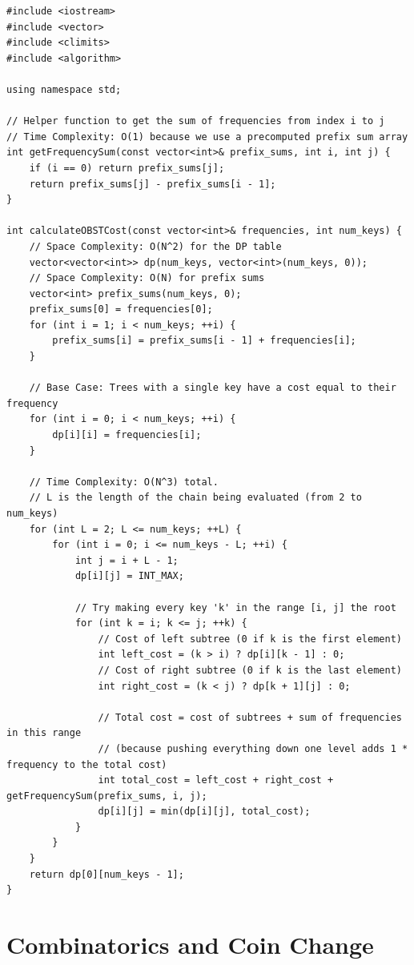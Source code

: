\begin{lstlisting}
#include <iostream>
#include <vector>
#include <climits>
#include <algorithm>

using namespace std;

// Helper function to get the sum of frequencies from index i to j
// Time Complexity: O(1) because we use a precomputed prefix sum array
int getFrequencySum(const vector<int>& prefix_sums, int i, int j) {
    if (i == 0) return prefix_sums[j];
    return prefix_sums[j] - prefix_sums[i - 1];
}

int calculateOBSTCost(const vector<int>& frequencies, int num_keys) {
    // Space Complexity: O(N^2) for the DP table
    vector<vector<int>> dp(num_keys, vector<int>(num_keys, 0));
    // Space Complexity: O(N) for prefix sums
    vector<int> prefix_sums(num_keys, 0);
    prefix_sums[0] = frequencies[0];
    for (int i = 1; i < num_keys; ++i) {
        prefix_sums[i] = prefix_sums[i - 1] + frequencies[i];
    }
    
    // Base Case: Trees with a single key have a cost equal to their frequency
    for (int i = 0; i < num_keys; ++i) {
        dp[i][i] = frequencies[i];
    }
    
    // Time Complexity: O(N^3) total.
    // L is the length of the chain being evaluated (from 2 to num_keys)
    for (int L = 2; L <= num_keys; ++L) {
        for (int i = 0; i <= num_keys - L; ++i) {
            int j = i + L - 1;
            dp[i][j] = INT_MAX;
            
            // Try making every key 'k' in the range [i, j] the root
            for (int k = i; k <= j; ++k) {
                // Cost of left subtree (0 if k is the first element)
                int left_cost = (k > i) ? dp[i][k - 1] : 0;
                // Cost of right subtree (0 if k is the last element)
                int right_cost = (k < j) ? dp[k + 1][j] : 0;
                
                // Total cost = cost of subtrees + sum of frequencies in this range
                // (because pushing everything down one level adds 1 * frequency to the total cost)
                int total_cost = left_cost + right_cost + getFrequencySum(prefix_sums, i, j);
                dp[i][j] = min(dp[i][j], total_cost);
            }
        }
    }
    return dp[0][num_keys - 1];
}
\end{lstlisting}

\section{Combinatorics and Coin Change}

